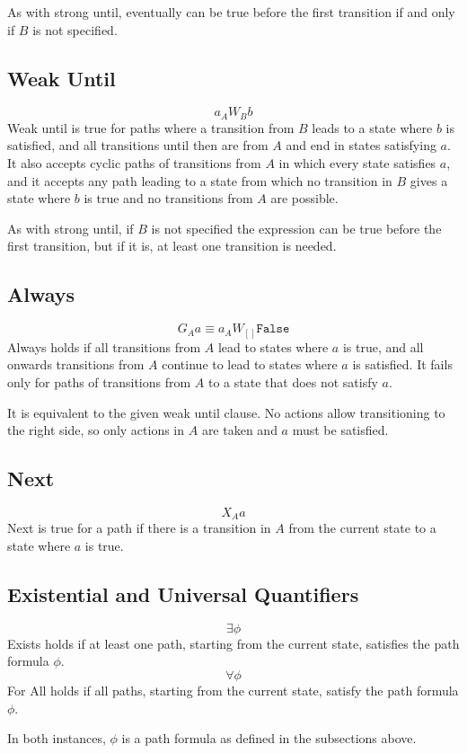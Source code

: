 \documentclass[a4paper,11pt]{article}
\begin{document}
	As with strong until, eventually can be true before the first transition if and only if $B$ is not specified.
	
	\subsection{Weak Until}
	$$a _A W{_B b} $$
	Weak until is true for paths where a transition from $B$ leads to a state where $b$ is satisfied, and all transitions until then are from $A$ and end in states satisfying $a$. It also accepts cyclic paths of transitions from $A$ in which every state satisfies $a$, and it accepts any path leading to a state from which no transition in $B$ gives a state where $b$ is true and no transitions from $A$ are possible.
	
	As with strong until, if $B$ is not specified the expression can be true before the first transition, but if it is, at least one transition is needed.
	
	\subsection{Always}
	$$G{_Aa} \equiv a _A W{_{[]} \texttt{False}} $$
	Always holds if all transitions from $A$ lead to states where $a$ is true, and all onwards transitions from $A$ continue to lead to states where $a$ is satisfied. It fails only for paths of transitions from $A$ to a state that does not satisfy $a$.
	
	It is equivalent to the given weak until clause. No actions allow transitioning to the right side, so only actions in $A$ are taken and $a$ must be satisfied.
	
	\subsection{Next}
	$$X{_Aa}$$
	Next is true for a path if there is a transition in $A$ from the current state to a state where $a$ is true. 
	
	\subsection{Existential and Universal Quantifiers}
	$$\exists \phi$$
	Exists holds if at least one path, starting from the current state, satisfies the path formula $\phi$.
	$$\forall \phi$$
	For All holds if all paths, starting from the current state, satisfy the path formula $\phi$.
	
	In both instances, $\phi$ is a path formula as defined in the subsections above.
	
\end{document}
